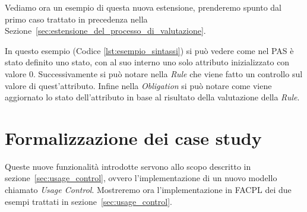 Vediamo ora un esempio di questa nuova estensione, prenderemo spunto dal primo caso trattato in precedenza nella Sezione~\ref{sec:estensione_del_processo_di_valutazione}.

In questo esempio (Codice \ref{lst:esempio_sintassi}) si può vedere come nel PAS è stato definito uno stato, con al suo interno uno solo attributo inizializzato con valore $0$.
Successivamente si può notare nella \textit{Rule} che viene fatto un controllo sul valore di quest'attributo.
Infine nella \textit{Obligation} si può notare come viene aggiornato lo stato dell'attributo in base al risultato della valutazione della \textit{Rule}.

\section{Formalizzazione dei case study} %
\label{sec:esempi}

Queste nuove funzionalità introdotte servono allo scopo descritto in sezione~\ref{sec:usage_control}, ovvero l'implementazione di un nuovo modello chiamato \textit{Usage Control}.
Mostreremo ora l'implementazione in FACPL dei due esempi trattati in sezione~\ref{sec:usage_control}. 
